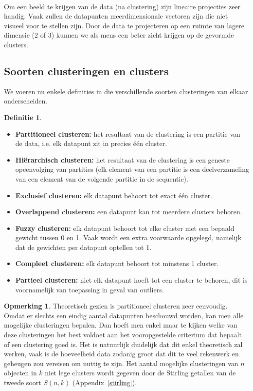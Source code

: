 \documentclass[a4paper,12pt]{article}
\theoremstyle{definition}
\newtheorem{definition}{Definitie}[subsection]
\newtheorem{opm}{Opmerking}[subsection]
\begin{document}
\ \\
Om een beeld te krijgen van de data (na clustering) zijn lineaire projecties zeer
handig. Vaak zullen de datapunten meerdimensionale vectoren zijn die niet visueel
voor te stellen zijn. Door de data te projecteren op een ruimte van lagere dimensie
(2 of 3) kunnen we als mens een beter zicht krijgen op de gevormde clusters.


\subsection{Soorten clusteringen en clusters}
We voeren nu enkele definities in die verschillende soorten
clusteringen van elkaar onderscheiden.
\begin{definition}
\item
 \begin{itemize}
  \item \textbf{Partitioneel clusteren:} het resultaat van de clustering is een
	partitie van de data, i.e. elk datapunt zit in precies één cluster.
  \item \textbf{Hiërarchisch clusteren:} het resultaat van de clustering is een
	geneste opeenvolging van partities (elk element van een partitie is een
	deelverzameling van een element van de volgende partitie in de sequentie).
  \item \textbf{Exclusief clusteren:} elk datapunt behoort tot exact één cluster.
  \item \textbf{Overlappend clusteren:} een datapunt kan tot meerdere clusters behoren.
  \item \textbf{Fuzzy clusteren:} elk datapunt behoort tot elke cluster met een
	bepaald gewicht tussen 0 en 1. Vaak wordt een extra voorwaarde opgelegd,
	namelijk dat de gewichten per datapunt optellen tot 1.
  \item \textbf{Compleet clusteren:} elk datapunt behoort tot minstens 1 cluster.
  \item \textbf{Partieel clusteren:} niet elk datapunt hoeft tot een cluster te 
	behoren, dit is voornamelijk van toepassing in geval van outliers.
 \end{itemize}
\end{definition}

\begin{opm}
Theoretisch gezien is partitioneel clusteren zeer eenvoudig. Omdat er slechts een
eindig aantal datapunten beschouwd worden, kan men alle mogelijke clusteringen bepalen.
Dan hoeft men enkel maar te kijken welke van deze clusteringen het best voldoet aan
het vooropgestelde criterium dat bepaalt of een clustering goed is. Het is natuurlijk
duidelijk dat dit enkel theoretisch zal werken, vaak is de hoeveelheid data zodanig
groot dat dit te veel rekenwerk en geheugen zou vereisen om nuttig te zijn.
Het aantal mogelijke clusteringen van $n$ objecten in $k$ niet lege clusters
wordt gegeven door de Stirling getallen van de tweede soort
$S(n,k)$
(Appendix~\ref{stirling}).
\end{opm}
\end{document}
